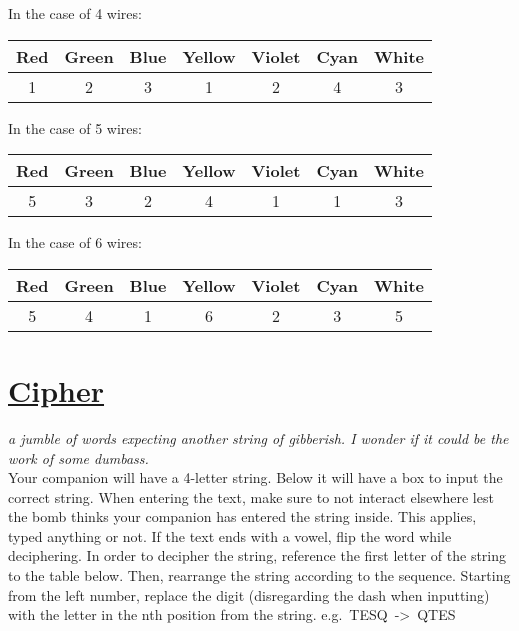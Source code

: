\documentclass[letterpaper,12pt]{report}
\begin{document}
\begin{center}
  \noindent
  In the case of 4 wires:\vspace{2mm}
  \begin{tabular}{ |c|c|c|c|c|c|c| }
    \hline
    Red & Green & Blue & Yellow & Violet & Cyan & White \\\hline
    1   & 2     & 3    & 1      & 2      & 4    & 3     \\
    \hline
  \end{tabular}
\end{center}

\begin{center}
  \noindent
  In the case of 5 wires:\vspace{2mm}
  \begin{tabular}{ |c|c|c|c|c|c|c| }
    \hline
    Red & Green & Blue & Yellow & Violet & Cyan & White \\
    \hline
    5   & 3     & 2    & 4      & 1      & 1    & 3     \\
    \hline
  \end{tabular}
\end{center}

\begin{center}
  \noindent
  In the case of 6 wires:\vspace{2mm}
  \begin{tabular}{ |c|c|c|c|c|c|c| }
    \hline
    Red & Green & Blue & Yellow & Violet & Cyan & White \\
    \hline
    5   & 4     & 1    & 6      & 2      & 3    & 5     \\
    \hline
  \end{tabular}
\end{center}
\pagebreak


\section*{\underline{Cipher}}
\textit{a jumble of words expecting another string of gibberish. I wonder if it could be the work of some dumbass.}\\[1cm]
Your companion will have a 4-letter string. Below it will have a box to input the correct string. When entering the text, make sure to not interact elsewhere lest the bomb thinks your companion has entered the string inside. This applies, typed anything or not.
If the text ends with a vowel, flip the word while deciphering.
In order to decipher the string, reference the first letter of the string to the table below.
Then, rearrange the string according to the sequence. Starting from the left number,
replace the digit (disregarding the dash when inputting) with the letter in the nth position from the string.  \mbox{e.g. TESQ -> QTES}
\end{document}
